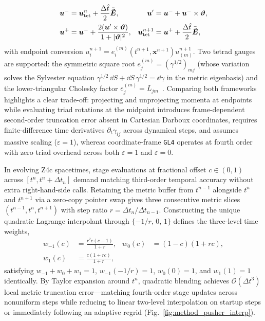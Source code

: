 \begin{align}\label{eq:boris_rotation}
\bm{u}^- &= \bm{u}_{\rm tet}^n + \frac{\Delta\hat{t}}{2}\bar{\bm{\tilde{E}}}, &
\bm{u}' &= \bm{u}^- + \bm{u}^- \times \bm{\vartheta}, \nonumber\\
\bm{u}^+ &= \bm{u}^- + \frac{2(\bm{u}' \times \bm{\vartheta})}{1 + |\bm{\vartheta}|^2}, &
\bm{u}_{\rm tet}^{n+1} &= \bm{u}^+ + \frac{\Delta\hat{t}}{2}\bar{\bm{\tilde{E}}},
\end{align}
with endpoint conversion $u_i^{n+1} = e^{(m)}_i(t^{n+1},\bm{x}^{n+1})u_{(m)}^{n+1}$. Two tetrad gauges are supported: the symmetric square root $e^{(m)}_j = (\gamma^{1/2})_{mj}$ (whose variation solves the Sylvester equation $\gamma^{1/2}\,\dd S + \dd S\,\gamma^{1/2} = \dd\gamma$ in the metric eigenbasis) and the lower-triangular Cholesky factor $e^{(m)}_j = L_{jm}$~\cite{Wu:2026nrpic}. Comparing both frameworks highlights a clear trade-off: projecting and unprojecting momenta at endpoints while evaluating triad rotations at the midpoint introduces frame-dependent second-order truncation error absent in Cartesian Darboux coordinates, requires finite-difference time derivatives $\partial_t\gamma_{ij}$ across dynamical steps, and assumes massive scaling ($\varepsilon=1$), whereas coordinate-frame \texttt{GL4} operates at fourth order with zero triad overhead across both $\varepsilon = 1$ and $\varepsilon = 0$.

In evolving Z4c spacetimes, stage evaluations at fractional offset $c \in (0, 1)$ across $[t^n, t^n + \Delta t_n]$ demand matching third-order temporal accuracy without extra right-hand-side calls. Retaining the metric buffer from $t^{n-1}$ alongside $t^n$ and $t^{n+1}$ via a zero-copy pointer swap gives three consecutive metric slices $(t^{n-1}, t^n, t^{n+1})$ with step ratio $r = \Delta t_n / \Delta t_{n-1}$. Constructing the unique quadratic Lagrange interpolant through $\{-1/r,\, 0,\, 1\}$ defines the three-level time weights,
\begin{align}\label{eq:lagrange3}
w_{-1}(c) &= \frac{r^2 c(c-1)}{1+r}, &
w_0(c) &= (1-c)(1+rc), \nonumber\\
w_1(c) &= \frac{c(1+rc)}{1+r},
\end{align}
satisfying $w_{-1} + w_0 + w_1 = 1$, $w_{-1}(-1/r)=1$, $w_0(0)=1$, and $w_1(1)=1$ identically. By Taylor expansion around $t^n$, quadratic blending achieves $\mathcal{O}(\Delta t^3)$ local metric truncation error—matching fourth-order stage updates across nonuniform steps while reducing to linear two-level interpolation on startup steps or immediately following an adaptive regrid (Fig.~\ref{fig:method_pusher_interp}).

